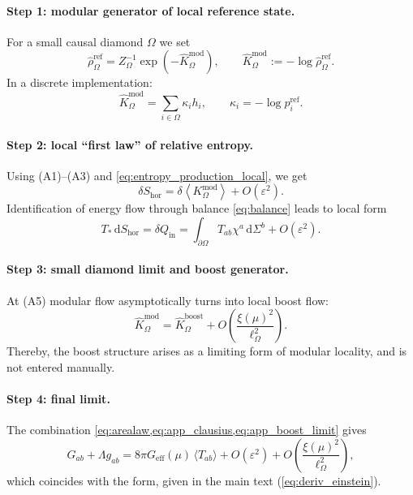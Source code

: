 \documentclass[11pt,a4paper]{article}
\newcommand{\dd}{\mathrm{d}}
\theoremstyle{definition}
\theoremstyle{plain}
\theoremstyle{remark}
\begin{document}
\paragraph{Step 1: modular generator of local reference state.}
For a small causal diamond $\Omega$ we set
\begin{equation}\label{eq:app_modular_state}
\hat\rho_{\Omega}^{\mathrm{ref}}
=
Z_\Omega^{-1}\exp\!\left(-\hat K_{\Omega}^{\mathrm{mod}}\right),
\qquad
\hat K_{\Omega}^{\mathrm{mod}}:=-\log \hat\rho_{\Omega}^{\mathrm{ref}}.
\end{equation}
In a discrete implementation:
\begin{equation}\label{eq:app_modular_discrete}
\hat K_{\Omega}^{\mathrm{mod}}
=
\sum_{i\in\Omega}\kappa_i h_i,
\qquad
\kappa_i=-\log p_i^{\mathrm{ref}}.
\end{equation}

\paragraph{Step 2: local ``first law'' of relative entropy.}
Using (A1)--(A3) and \cref{eq:entropy_production_local}, we get
\begin{equation}\label{eq:app_firstlaw_mod}
\delta S_{\mathrm{hor}}
=
\delta\!\left\langle K_{\Omega}^{\mathrm{mod}}\right\rangle
+O(\varepsilon^2).
\end{equation}
Identification of energy flow through balance \cref{eq:balance} leads to local form
\begin{equation}\label{eq:app_clausius}
T_\ast\,\dd S_{\mathrm{hor}}
=
\delta Q_{\mathrm{in}}
=
\int_{\partial\Omega}T_{ab}\chi^a\,\dd\Sigma^b
+O(\varepsilon^2).
\end{equation}

\paragraph{Step 3: small diamond limit and boost generator.}
At (A5) modular flow asymptotically turns into local boost flow:
\begin{equation}\label{eq:app_boost_limit}
\hat K_{\Omega}^{\mathrm{mod}}
=
\hat K_{\Omega}^{\mathrm{boost}}
+O\!\left(\frac{\xi(\mu)^2}{\ell_\Omega^2}\right).
\end{equation}
Thereby, the boost structure arises as a limiting form of modular locality, and is not entered manually.

\paragraph{Step 4: final limit.}
The combination \cref{eq:arealaw,eq:app_clausius,eq:app_boost_limit} gives
\begin{equation}\label{eq:app_einstein_full}
G_{ab}+\Lambda g_{ab}
=
8\pi G_{\mathrm{eff}}(\mu)\,\langle T_{ab}\rangle
+O(\varepsilon^2)
+O\!\left(\frac{\xi(\mu)^2}{\ell_\Omega^2}\right),
\end{equation}
which coincides with the form, given in the main text (\cref{eq:deriv_einstein}).
\end{document}
